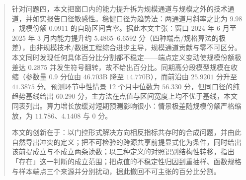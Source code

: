 \begin{abstract}
针对问题四，本文把窗口内的能力提升拆为规模通道与规模之外的技术通道，并如实报告口径敏感性。稳健口径为趋势法：两通道月斜率之比为 $9.98$，规模份额 $0.0911$ 的自助区间含零。据此本文主张：窗口 2024 年 6 月至 2025 年 3 月内能力提升约 $5.4865$--$6.6592$ 分（四种端点/规格算法的极差），由非规模技术/数据工程综合进步主导，规模通道贡献与零不可区分。本文同时发现任何具体百分比分割都不稳定——端点定义变动使规模份额极差达 $0.2875$ 并发生符号翻转，故不给出百分比。同期高分段模型规模在收缩（参数量 0.9 分位由 $46.703$B 降至 $14.770$B），而前沿由 $25.9201$ 分升至 $41.3875$ 分。预测环节中性情景 12 个月中位数为 $56.330$ 分，但同口径的纯趋势基线给出 $60.290$ 分，主方法在点值与区间宽度上均不优于基线，本文同表列出。算力增长放缓对短期预测影响很小：情景极差随规模份额严格缩放，为 $11.786$、$4.1408$ 与 $0$ 分。

本文的创新在于：以门控形式解决方向相反指标共存时的合成问题，并由此自然导出冲突的定义；把不可检验的跨源共享前提显式化为条件，同时给出该前提成立与不成立两条读数；以三种定义的对照识别结构性转移，指出「存在」这一判断的成立范围；把点值的不稳定性归因到重抽样、函数规格与样本端点三个来源并分别扰动，据此撤回不可主张的百分比分割。

\end{abstract}
